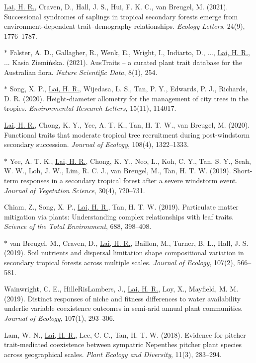\documentclass[a4paper]{article}
\begin{document}
\hangindent=1cm \underline{Lai, H. R.}, Craven, D., Hall, J. S., Hui, F. K. C., van Breugel, M. (2021). Successional syndromes of saplings in tropical secondary forests emerge from environment-dependent trait–demography relationships. \textit{Ecology Letters}, 24(9), 1776–1787.

$\ast$ \hangindent=1cm Falster, A. D., Gallagher, R., Wenk, E., Wright, I., Indiarto, D., ..., \underline{Lai, H. R.}, ... Kasia Ziemińska. (2021). AusTraits – a curated plant trait database for the Australian flora. \textit{Nature Scientific Data}, 8(1), 254.

$\ast$ \hangindent=1cm Song, X. P., \underline{Lai, H. R.}, Wijedasa, L. S., Tan, P. Y., Edwards, P. J., Richards, D. R. (2020). Height-diameter allometry for the management of city trees in the tropics. \textit{Environmental Research Letters}, 15(11), 114017.

\hangindent=1cm \underline{Lai, H. R.}, Chong, K. Y., Yee, A. T. K., Tan, H. T. W., van Breugel, M. (2020). Functional traits that moderate tropical tree recruitment during post-windstorm secondary succession. \textit{Journal of Ecology}, 108(4), 1322–1333. 

$\ast$ \hangindent=1cm Yee, A. T. K., \underline{Lai, H. R.}, Chong, K. Y., Neo, L., Koh, C. Y., Tan, S. Y., Seah, W. W., Loh, J. W., Lim, R. C. J., van Breugel, M., Tan, H. T. W. (2019). Short-term responses in a secondary tropical forest after a severe windstorm event. \textit{Journal of Vegetation Science}, 30(4), 720–731. 

\hangindent=1cm Chiam, Z., Song, X. P., \underline{Lai, H. R.}, Tan, H. T. W. (2019). Particulate matter mitigation via plants: Understanding complex relationships with leaf traits. \textit{Science of the Total Environment}, 688, 398–408.

$\ast$ \hangindent=1cm van Breugel, M., Craven, D., \underline{Lai, H. R.}, Baillon, M., Turner, B. L., Hall, J. S. (2019). Soil nutrients and dispersal limitation shape compositional variation in secondary tropical forests across multiple scales. \textit{Journal of Ecology}, 107(2), 566–581.

\hangindent=1cm Wainwright, C. E., HilleRisLambers, J., \underline{Lai, H. R.}, Loy, X., Mayfield, M. M. (2019). Distinct responses of niche and fitness differences to water availability underlie variable coexistence outcomes in semi-arid annual plant communities. \textit{Journal of Ecology}, 107(1), 293–306.

\hangindent=1cm Lam, W. N., \underline{Lai, H. R.}, Lee, C. C., Tan, H. T. W. (2018). Evidence for pitcher trait-mediated coexistence between sympatric Nepenthes pitcher plant species across geographical scales. \textit{Plant Ecology and Diversity}, 11(3), 283–294.
\end{document}
